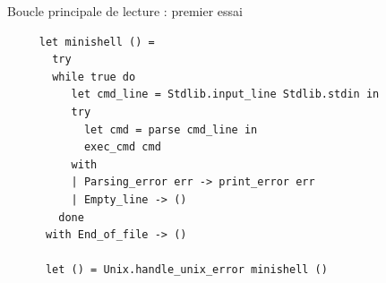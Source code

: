 \begin{frame}[fragile]{Boucle principale de lecture : premier essai}

    \begin{lstlisting}
     let minishell () =
       try
       while true do
          let cmd_line = Stdlib.input_line Stdlib.stdin in
          try
            let cmd = parse cmd_line in
            exec_cmd cmd
          with
          | Parsing_error err -> print_error err
          | Empty_line -> ()
        done
      with End_of_file -> ()

      let () = Unix.handle_unix_error minishell ()

    \end{lstlisting}

\end{frame}
